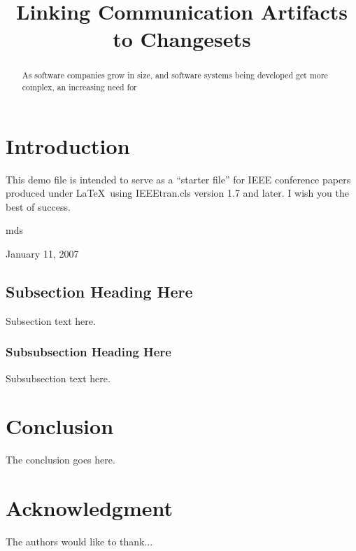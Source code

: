 \documentclass[conference]{IEEEtran}
\begin{document}
\title{Linking Communication Artifacts to Changesets}

\author{
\and
{}
\and
{}
}

\maketitle

\begin{abstract}
As software companies grow in size, and software systems being developed get more complex, an increasing need for 
\end{abstract}


\section{Introduction}
This demo file is intended to serve as a ``starter file''
for IEEE conference papers produced under \LaTeX\ using
IEEEtran.cls version 1.7 and later.
I wish you the best of success.

\hfill mds
 
\hfill January 11, 2007

\subsection{Subsection Heading Here}
Subsection text here.

\subsubsection{Subsubsection Heading Here}
Subsubsection text here.


\section{Conclusion}
The conclusion goes here.


\section*{Acknowledgment}
The authors would like to thank...




\end{document}
